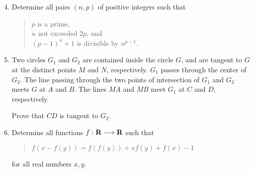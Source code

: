\documentclass[12pt]{article}
\begin{document}
\vspace*{.3in}

\begin{enumerate}
\setcounter{enumi}{3}
\item %
Determine all pairs $(n,p)$ of positive integers such that 
\begin{quote}
     $p$ is a prime, \\ 
     $n$ not exceeded $2p$, and \\
     $(p-1)^{n} + 1$ is divisible by $n^{p-1}$. 
\end{quote}

\item %
Two circles $G_{1}$ and $G_{2}$ are contained inside the circle $G$, and are tangent to $G$ at the distinct points $M$ and $N$, respectively. $G_{1}$
passes through the center of $G_{2}$. The line passing through the two points of intersection of $G_{1}$ and $G_{2}$ meets $G$ at $A$ and $B$. The
lines $MA$ and $MB$ meet $G_{1}$ at $C$ and $D$, respectively. 

Prove that $CD$ is tangent to $G_{2}$. 

\item %
Determine all functions $f:{\textbf R} \longrightarrow {\textbf R}$ such that 
\begin{quote}
             $f(x-f(y))=f(f(y)) + x f(y)+f(x)-1$ 
\end{quote}
for all real numbers $x,y$. 

\end{enumerate}
\end{document}
